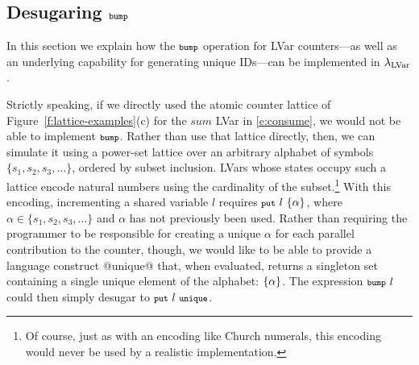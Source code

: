 \subsection{Desugaring $\mbox{\footnotesize \texttt{bump}}$}\label{subsection:bump}

{%
In this section we explain how the $\mbox{\footnotesize \texttt{bump}}$ operation for LVar counters---as well as an underlying
  capability for generating unique IDs---can be implemented in $\textup{\ensuremath{\lambda_{\textrm{LVar}}}}$.}

Strictly speaking, if we directly used the atomic counter lattice of Figure~\ref{f:lattice-examples}(c) for the $\mathit{sum}$ LVar in \eqref{e:consume}, we would not
  be able to implement $\mbox{\footnotesize \texttt{bump}}$.
Rather than use that lattice directly, then, we can simulate it 
using a power-set lattice over an arbitrary alphabet of symbols
$\lbrace s_1, s_2, s_3, \ldots\rbrace$, ordered by subset inclusion.
%
LVars whose states occupy such a lattice encode natural numbers using the cardinality
of the subset.\footnote{Of course, just as with an encoding like
  Church numerals, this encoding would never be used by a realistic
  implementation.}  
With this encoding, incrementing a shared variable $l$
requires $\mbox{\footnotesize \texttt{put}}~l~\lbrace \alpha \rbrace$, where 
  $\alpha \in \lbrace s_1, s_2, s_3, \ldots\rbrace$ and 
$\alpha$ has not previously been used.
Rather than requiring the programmer to be responsible for creating a
unique $\alpha$ for each parallel contribution to the counter, though,
we would like to be able to provide a language construct @unique@
that, when evaluated, returns a singleton set containing a single
unique element of the alphabet: $\lbrace \alpha \rbrace$. The expression $\mbox{\footnotesize \texttt{bump}}~l$ could then simply desugar to $\mbox{\footnotesize \texttt{put}}~l~\mbox{\footnotesize \texttt{unique}}$.

